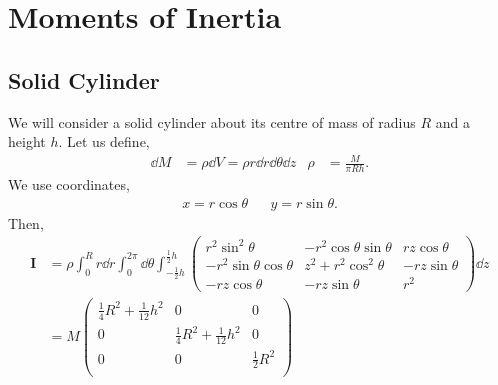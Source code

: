 \documentclass{book}
\begin{document}
\chapter{Moments of Inertia}
\section{Solid Cylinder}
We will consider a solid cylinder about its centre of mass of radius $R$ and a height $h$. Let us define,
\begin{align}
    \dd{M} & = \rho\dd{V} = \rho r \dd{r}\dd{\theta}\dd{z} & \rho & = \frac{M}{\pi R h}.
\end{align}
We use coordinates,
\begin{align}
    x = r \cos\theta && y = r\sin\theta.
\end{align}
Then,
\begin{equation}
\begin{split}
    \mathbf{I} & = \rho\int_0^Rr\dd{r}\int_0^{2\pi}\dd{\theta} \int_{-\frac{1}{2}h}^{\frac{1}{2}h}\begin{pmatrix}
        r^2\sin^2\theta & -r^2\cos\theta\sin\theta & rz\cos\theta \\
        -r^2\sin\theta\cos\theta & z^2 + r^2\cos^2\theta & -rz\sin\theta \\
        -rz\cos\theta & -rz\sin\theta & r^2
    \end{pmatrix}\dd{z}
    \\
    & = M\begin{pmatrix}
        \frac{1}{4}R^2 + \frac{1}{12}h^2 & 0 & 0\\
        0 & \frac{1}{4}R^2 + \frac{1}{12}h^2 & 0 \\
        0 & 0 & \frac{1}{2}R^2 \\
    \end{pmatrix}
\end{split}
\end{equation}
\end{document}
